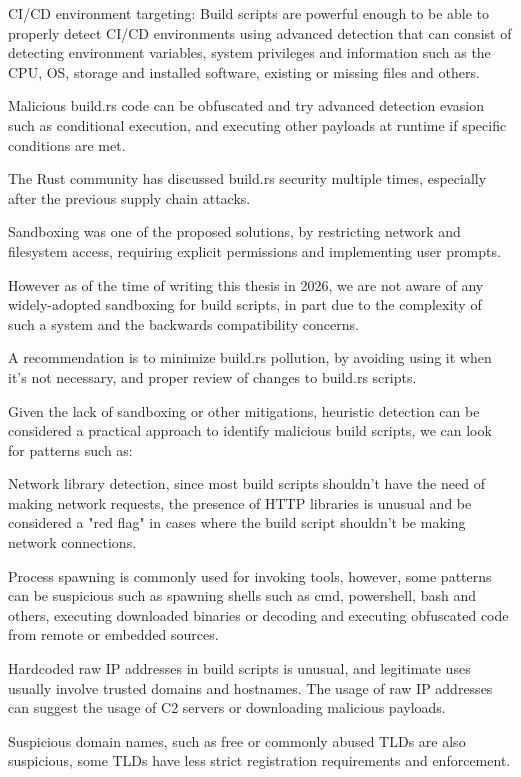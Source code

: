 CI/CD environment targeting: Build scripts are powerful enough to be able to properly detect CI/CD environments using advanced detection that can consist of detecting environment variables, system privileges and information such as the CPU, OS, storage and installed software, existing or missing files and others.

Malicious build.rs code can be obfuscated and try advanced detection evasion such as conditional execution, and executing other payloads at runtime if specific conditions are met.

The Rust community has discussed build.rs security multiple times, especially after the previous supply chain attacks.

Sandboxing was one of the proposed solutions, by restricting network and filesystem access, requiring explicit permissions and implementing user prompts.

However as of the time of writing this thesis in 2026, we are not aware of any widely-adopted sandboxing for build scripts, in part due to the complexity of such a system and the backwards compatibility concerns.

A recommendation is to minimize build.rs pollution, by avoiding using it when it's not necessary, and proper review of changes to build.rs scripts. 

Given the lack of sandboxing or other mitigations, heuristic detection can be considered a practical approach to identify malicious build scripts, we can look for patterns such as:

Network library detection, since most build scripts shouldn't have the need of making network requests, the presence of HTTP libraries is unusual and be considered a "red flag" in cases where the build script shouldn't be making network connections.

Process spawning is commonly used for invoking tools, however, some patterns can be suspicious such as spawning shells such as cmd, powershell, bash and others, executing downloaded binaries or decoding and executing obfuscated code from remote or embedded sources.

Hardcoded raw IP addresses in build scripts is unusual, and legitimate uses usually involve trusted domains and hostnames. The usage of raw IP addresses can suggest the usage of C2 servers or downloading malicious payloads.

Suspicious domain names, such as free or commonly abused TLDs are also suspicious, some TLDs have less strict registration requirements and enforcement.

